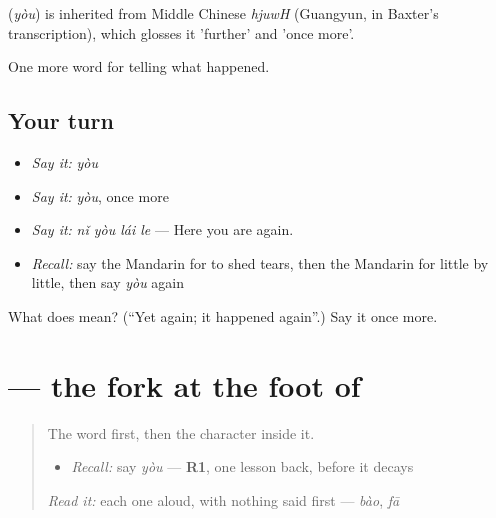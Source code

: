 \begin{cousinweb}
\textbf{} (\emph{yòu}) is inherited from Middle Chinese \emph{hjuwH} (Guangyun, in Baxter's transcription), which glosses it 'further' and 'once more'.
\end{cousinweb}

\begin{grammarlens}[title={What you've built}]
One more word for telling what happened.
\end{grammarlens}

\subsection*{Your turn}
\begin{itemize}
\raggedright
  \item \emph{Say it:} \emph{yòu}
  \item \emph{Say it:} \emph{yòu}, once more
  \item \emph{Say it:} \emph{nǐ yòu lái le} — Here you are again.
  \item \emph{Recall:} say the Mandarin for to shed tears, then the Mandarin for little by little, then say \emph{yòu} again
\end{itemize}

\begin{tcolorbox}[breakable,colback=teal!4,colframe=teal!35!black,title={Before you move on}]
What does  mean? (\textquotedblleft{}Yet again; it happened again\textquotedblright{}.) Say it once more.
\end{tcolorbox}
\section[\texorpdfstring{\zh{又} (yòu)}{又 (yòu)}]{ — the fork at the foot of }

\label{lesson:ZH-W315-you-again}



\begin{quote}
The word first, then the character inside it.

\begin{itemize}
\raggedright
  \item \emph{Recall:} say \emph{yòu} — \textbf{R1}, one lesson back, before it decays
\end{itemize}

\begin{quote}
 
\end{quote}

\emph{Read it:} each one aloud, with nothing said first — \emph{bào}, \emph{fā}
\end{quote}

